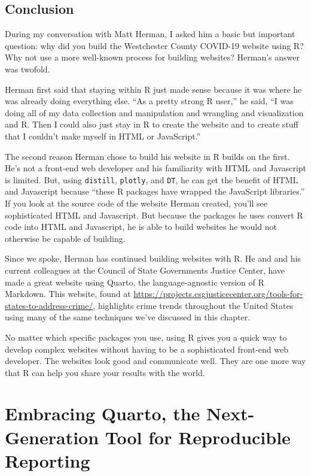 \documentclass[
]{book}
\begin{document}
\hypertarget{conclusion-1}{%
\section*{Conclusion}\label{conclusion-1}}

During my conversation with Matt Herman, I asked him a basic but important question: why did you build the Westchester County COVID-19 website using R? Why not use a more well-known process for building websites? Herman's answer was twofold.

Herman first said that staying within R just made sense because it was where he was already doing everything else. ``As a pretty strong R user,'' he said, ``I was doing all of my data collection and manipulation and wrangling and visualization and R. Then I could also just stay in R to create the website and to create stuff that I couldn't make myself in HTML or JavaScript.''

The second reason Herman chose to build his website in R builds on the first. He's not a front-end web developer and his familiarity with HTML and Javascript is limited. But, using \texttt{distill}, \texttt{plotly}, and \texttt{DT}, he can get the benefit of HTML and Javascript because ``these R packages have wrapped the JavaScript libraries.'' If you look at the source code of the website Herman created, you'll see sophisticated HTML and Javascript. But because the packages he uses convert R code into HTML and Javascript, he is able to build websites he would not otherwise be capable of building.

Since we spoke, Herman has continued building websites with R.
He and and his current colleagues at the Council of State Governments Justice Center, have made a great website using Quarto, the language-agnostic version of R Markdown. This website, found at \url{https://projects.csgjusticecenter.org/tools-for-states-to-address-crime/}, highlights crime trends throughout the United States using many of the same techniques we've discussed in this chapter.

No matter which specific packages you use, using R gives you a quick way to develop complex websites without having to be a sophisticated front-end web developer. The websites look good and communicate well. They are one more way that R can help you share your results with the world.

\hypertarget{embracing-quarto-the-next-generation-tool-for-reproducible-reporting}{%
\chapter{Embracing Quarto, the Next-Generation Tool for Reproducible Reporting}\label{embracing-quarto-the-next-generation-tool-for-reproducible-reporting}}
\end{document}
